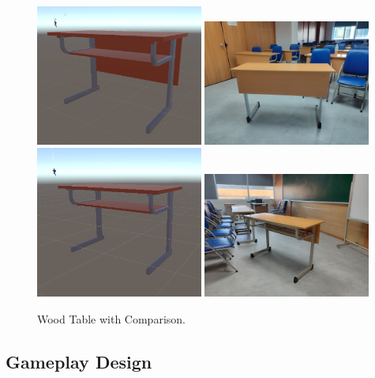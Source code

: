 \documentclass[12pt]{article}
\begin{document}
\begin{figure}[H]
    \centering
    \includegraphics[width=0.49\textwidth]{o5.png}
    \includegraphics[width=0.49\textwidth]{go.jpg}
    \includegraphics[width=0.49\textwidth]{o6.png}
    \includegraphics[width=0.49\textwidth]{go2.jpg}
    \caption{Wood Table with Comparison.}
\end{figure}

\subsection{Gameplay Design}
\end{document}
